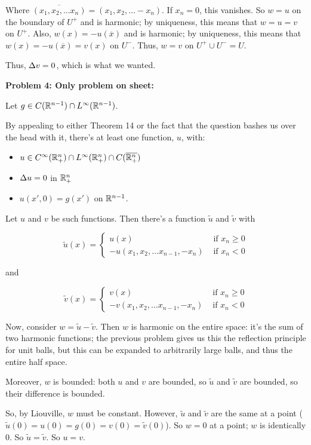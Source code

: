 \documentclass[a4paper,12pt]{article}
\begin{document}
Where $\overline{(x_1,x_2, \ldots x_n)} = (x_1,x_2, \ldots -x_n)$. If $x_n = 0$, this vanishes. So $w = u$ on the boundary of $U^+$ and is harmonic; by uniqueness, this means that $w=u=v$ on $U^+$. Also, $w(x) = -u(\overline{x})$ and is harmonic; by uniqueness, this means that $w(x)=-u(\overline{x})=v(x)$ on $U^-$. Thus, $w=v$ on $U^+ \cup U^- = U$.

Thus, $\Delta v = 0$, which is what we wanted.

\shunt

{\bf Problem 4: Only problem on sheet:}

Let $g \in C(\mathbb{R}^{n-1}) \cap L^\infty (\mathbb{R}^{n-1})$.

By appealing to either Theorem 14 or the fact that the question bashes us over the head with it, there's at least one function, $u$, with:

\begin{itemize}
\item $u \in C^\infty( \mathbb{R}^n_+) \cap L^\infty  (\mathbb{R}^n_+) \cap C(\overline{\mathbb{R}^n_+})$
\item $\Delta u = 0$ in $\mathbb{R}^n_+$
\item $u(x',0) = g(x')$ on $\mathbb{R}^{n-1}$.
\end{itemize}

Let $u$ and $v$ be such functions. Then there's a function $\tilde{u}$ and $\tilde{v}$ with

\begin{displaymath}
\tilde{u}(x) =
   \left\{
     \begin{array}{lr}
       u(x) & \text{ if } x_n \geq 0\\
       -u(x_1,x_2, \ldots x_{n-1}, -x_n) & \text{ if } x_n < 0
     \end{array}
   \right.
\end{displaymath}

and

\begin{displaymath}
\tilde{v}(x) =
   \left\{
     \begin{array}{lr}
       v(x) & \text{ if } x_n \geq 0\\
       -v(x_1,x_2, \ldots x_{n-1}, -x_n) & \text{ if } x_n < 0
     \end{array}
   \right.
\end{displaymath}

Now, consider $w = \tilde{u} - \tilde{v}$. Then $w$ is harmonic on the entire space: it's the sum of two harmonic functions; the previous problem gives us this the reflection principle for unit balls, but this can be expanded to arbitrarily large balls, and thus the entire half space.

Moreover, $w$ is bounded: both $u$ and $v$ are bounded, so $\tilde{u}$ and $\tilde{v}$ are bounded, so their difference is bounded.

So, by Liouville, $w$ must be constant. However, $\tilde{u}$ and $\tilde{v}$ are the same at a point ($\tilde{u}(0) = u(0) = g(0) = v(0) = \tilde{v}(0)$). So $w = 0$ at a point; $w$ is identically $0$. So $\tilde{u} = \tilde{v}$. So $u = v$.

\shunt
\end{document}
